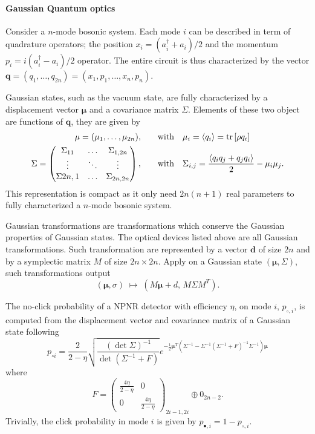 \paragraph{Gaussian Quantum optics}

Consider a $n$-mode bosonic system. 
Each mode $i$ can be described in term of quadrature operators; the position $x_i=(a_i^\dagger+a_i)/2$ and the momentum $p_i=i(a_i^\dagger-a_i)/2$ operator.
The entire circuit is thus characterized by the vector $\mathbf{q}=(q_1,\dots,q_{2n})=(x_1,p_1,\dots,x_n,p_n)$.

Gaussian states, such as the vacuum state, are fully characterized by a displacement vector $\mathbf{\mu}$ and a covariance matrix $\Sigma$.
Elements of these two object are functions of $\mathbf{q}$, they are given by
\begin{align}
	\mathbf{\mu} = (\mu_1,\dots,\mu_{2n}), \qquad &\text{with}\quad \mu_i = \mean{q_i} = \trr{\rho q_i} \\
	\Sigma = \begin{pmatrix} \Sigma_{11} & \dots & \Sigma_{1,2n} \\
							\vdots & \ddots & \vdots \\
						\Sigma{2n,1} & \dots & \Sigma_{2n,2n}\end{pmatrix} , \qquad &\text{with}\quad \Sigma_{i,j} = \frac{\mean{q_i q_j + q_j q_i}}{2}-\mu_i \mu_j.
\end{align}
This representation is compact as it only need $2n(n+1)$ real parameters to fully characterized a $n$-mode bosonic system.

Gaussian transformations are transformations which conserve the Gaussian properties of Gaussian states. 
The optical devices listed above are all Gaussian transformations.
Such transformation are represented by a vector $\mathbf{d}$ of size $2n$ and by a symplectic matrix $M$ of size $2n\times2n$.
Apply on a Gaussian state $(\mathbf{\mu},\Sigma)$, such transformations output
\begin{equation}
	(\mathbf{\mu},\sigma)\; \mapsto\; (M\mathbf{\mu} + d,\, M\Sigma M^T).
\end{equation}

The no-click probability of a NPNR detector with efficiency $\eta$, on mode $i$, $p_{\circ,i}$, is computed from the displacement vector and covariance matrix of a Gaussian state following
\begin{equation}
p_{\circ i} =\frac{2}{2-\eta}\sqrt{\frac{(\det \Sigma)^{-1}}{ \det(\Sigma^{-1}+F)}}
e^{-\frac{1}{2}{\mathbf{\mu} }^T\left( \Sigma^{-1} - \Sigma^{-1} (\Sigma^{-1}+F)^{-1} \Sigma^{-1} \right){\mathbf{\mu} }}
\end{equation}
where
\begin{equation}
F= \left(\begin{array}{cc}
    \frac{4\eta}{2-\eta} & 0 \\
    0 & \frac{4\eta}{2-\eta}
    \end{array}\right)_{2i-1,2i} \oplus 0_{2n-2}.
\end{equation}
Trivially, the click probability in mode $i$ is given by $p_{\bullet,i}=1-p_{\circ,i}$.

